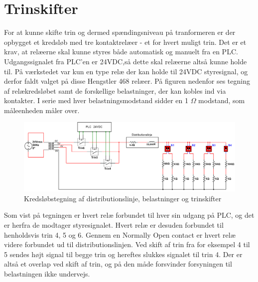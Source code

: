 

\section{Trinskifter}
For at kunne skifte trin og dermed spændingsniveau på tranformeren er der opbygget et kredsløb med tre kontaktrelæer - et for hvert muligt trin. Det er et krav, at relæerne skal kunne styres både automatisk og manuelt fra en PLC. Udgangssignalet fra PLC'en er 24VDC,så dette skal relæerne altså kunne holde til. På værkstedet var kun en type relæ der kan holde til 24VDC styresignal, og derfor faldt valget på disse Hengstler 468 relæer. På figuren nedenfor ses tegning af relækredsløbet samt de forskellige belastninger, der kan kobles ind via kontakter. I serie med hver belastningsmodstand sidder en 1 $\Omega$ modstand, som måleenheden måler over. 


\begin{figure}[H] 
	\centering
	\includegraphics[width=1\textwidth]{Figure/Trinskiftertegning}
	\caption{Kredsløbstegning af distributionslinje, belastninger og trinskifter}
	\label{fig:Trinskiftertegning}
\end{figure}

Som vist på tegningen er hvert relæ forbundet til hver sin udgang på PLC, og det er herfra de modtager styresignalet. Hvert relæ er desuden forbundet til henholdsvis trin 4, 5 og 6. Gennem en Normally Open contact er hvert relæ videre forbundet ud til distributionslinjen. Ved skift af trin fra for eksempel 4 til 5 sendes højt signal til begge trin og hereftes slukkes signalet til trin 4. Der er altså et overlap ved skift af trin, og på den måde forsvinder forsyningen til belastningen ikke undervejs. 